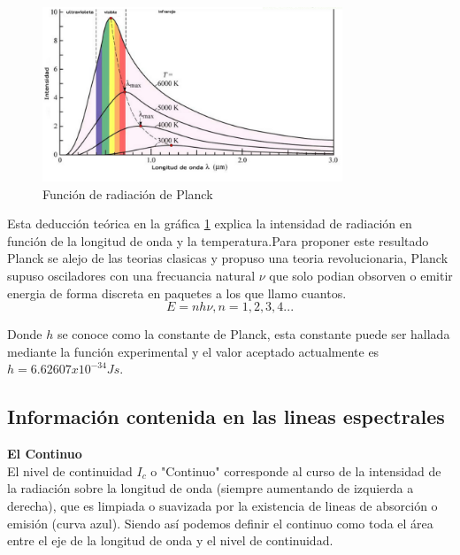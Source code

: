 \begin{figure}[htb!]
\centering
\includegraphics[width=0.8\textwidth]{images/6.png}
\caption[Descripción versión comprimida]{Función de radiación de Planck\cite{gra6}}
 \label{fig2}
\end{figure}




\noindent Esta deducción teórica en la gráfica \ref{fig2} explica la intensidad de radiación en función de la longitud de onda y la temperatura.Para proponer este resultado Planck se alejo de las teorias clasicas y propuso una teoria revolucionaria, Planck supuso osciladores con una frecuancia natural $\nu$ que solo podian obsorven o emitir energia de forma discreta en paquetes a los que llamo cuantos.
\begin{equation}
    E= nh\nu , n=1,2,3,4...
\end{equation}{}

\noindent Donde $h$ se conoce como la constante de Planck, esta constante puede ser hallada mediante la función experimental y el valor aceptado actualmente es $h=6.62607x10^{-34} Js$.



\subsection {Información contenida en las lineas espectrales}
\newline
\noindent \textbf{El Continuo}\\

\noindent El nivel de continuidad $I_c$ o "Continuo" corresponde al curso de la intensidad de la radiación sobre la longitud de onda (siempre aumentando de izquierda a derecha), que es limpiada o suavizada por la existencia de lineas de absorción o emisión (curva azul). Siendo así podemos definir el continuo como toda el área entre el eje de la longitud de onda y el nivel de continuidad.  

